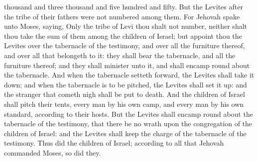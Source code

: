 thousand and three thousand and five hundred and fifty.  But the Levites after the tribe of their fathers were not numbered among them. For Jehovah spake unto Moses, saying, Only the tribe of Levi thou shalt not number, neither shalt thou take the sum of them among the children of Israel; but appoint thou the Levites over the tabernacle of the testimony, and over all the furniture thereof, and over all that belongeth to it: they shall bear the tabernacle, and all the furniture thereof; and they shall minister unto it, and shall encamp round about the tabernacle. And when the tabernacle setteth forward, the Levites shall take it down; and when the tabernacle is to be pitched, the Levites shall set it up: and the stranger that cometh nigh shall be put to death. And the children of Israel shall pitch their tents, every man by his own camp, and every man by his own standard, according to their hosts. But the Levites shall encamp round about the tabernacle of the testimony, that there be no wrath upon the congregation of the children of Israel: and the Levites shall keep the charge of the tabernacle of the testimony. Thus did the children of Israel; according to all that Jehovah commanded Moses, so did they. 

